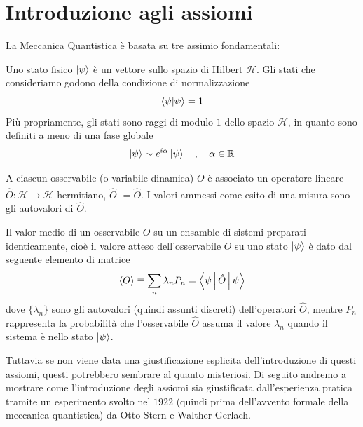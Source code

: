 \chapter{Introduzione agli assiomi}

La Meccanica Quantistica è basata su tre assimio fondamentali:

\begin{assioma}
    Uno stato fisico $\ket{\psi}$ è un vettore sullo spazio di Hilbert $\mathcal{H}$. Gli stati che consideriamo godono della condizione di normalizzazione 
    \begin{equation}
        \braket{\psi|\psi} = 1
    \end{equation}
    Più propriamente, gli stati sono raggi di modulo $1$ dello spazio $\mathcal{H}$, in quanto sono definiti a meno di una fase globale
    \begin{equation*}
        \ket{\psi} \sim e^{i\alpha} \ket{\psi} \quad , \quad \alpha \in \mathbb{R}
    \end{equation*}
\end{assioma}

\begin{assioma}
    A ciascun osservabile (o variabile dinamica) $O$ è associato un operatore lineare $\hat{O}: \mathcal{H} \to \mathcal{H}$ hermitiano, $\hat{O}^{\dagger} = \hat{O}$. I valori ammessi come esito di una misura sono gli autovalori di $\hat{O}$.
\end{assioma}

\begin{assioma}
    Il valor medio di un osservabile $O$ su un ensamble di sistemi preparati identicamente, cioè il valore atteso dell'osservabile $O$ su uno stato $\ket{\psi}$ è dato dal seguente elemento di matrice 
    \begin{equation}
        \langle O \rangle \equiv \sum_n \lambda_n P_n = \Braket{\psi |\hat{O}|\psi}
    \end{equation}
    dove $\{\lambda_n\}$ sono gli autovalori (quindi assunti discreti) dell'operatori $\hat{O}$, mentre $P_n$ rappresenta la probabilità che l'osservabile $\hat{O}$ assuma il valore $\lambda_n$ quando il sistema è nello stato $\ket{\psi}$. 
\end{assioma}

Tuttavia se non viene data una giustificazione esplicita dell'introduzione di questi assiomi, questi potrebbero sembrare al quanto misteriosi. Di seguito andremo a mostrare come l'introduzione degli assiomi sia giustificata dall'esperienza pratica tramite un esperimento svolto nel $1922$ (quindi prima dell'avvento formale della meccanica quantistica) da Otto Stern e Walther Gerlach.  


